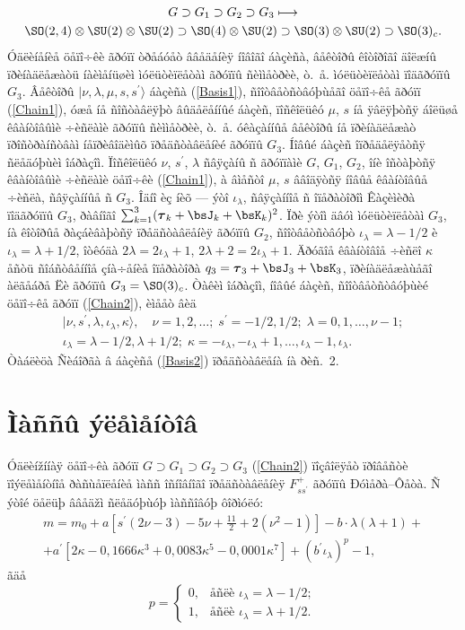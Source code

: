 \begin{multline}
G\supset G_1\supset G_2\supset G_3\longmapsto\\
\SO(2,4)\otimes\SU(2)\otimes\SU(2)\supset\SO(4)\otimes\SU(2)\supset\SO(3)\otimes\SU(2)\supset\SO(3)_c.\label{Chain2}
\end{multline}
Óäëèíåíèå öåïî÷êè ãðóïï òðåáóåò ââåäåíèÿ íîâîãî áàçèñà, âåêòîðû êîòîðîãî äîëæíû ïðèíàäëåæàòü íàèìåíüøèì ìóëüòèïëåòàì ãðóïïû ñèììåòðèè, ò.~å. ìóëüòèïëåòàì ïîäãðóïïû $G_3$. Âåêòîðû $|\nu,\lambda,\mu,s,s^\prime\rangle$ áàçèñà (\ref{Basis1}), ñîîòâåòñòâóþùåãî öåïî÷êå ãðóïï (\ref{Chain1}), óæå íå ñîñòàâëÿþò âûäåëåííûé áàçèñ, ïîñêîëüêó $\mu$, $s$ íå ÿâëÿþòñÿ áîëüøå êâàíòîâûìè ÷èñëàìè ãðóïïû ñèììåòðèè, ò.~å. óêàçàííûå âåêòîðû íå ïðèíàäëåæàò ïðîñòðàíñòâàì íåïðèâîäèìûõ ïðåäñòàâëåíèé ãðóïïû $G_3$. Íîâûé áàçèñ îïðåäåëÿåòñÿ ñëåäóþùèì îáðàçîì. Ïîñêîëüêó $\nu$, $s^\prime$, $\lambda$ ñâÿçàíû ñ ãðóïïàìè $G$, $G_1$, $G_2$, îíè îñòàþòñÿ êâàíòîâûìè ÷èñëàìè öåïî÷êè (\ref{Chain1}), à âìåñòî $\mu$, $s$ ââîäÿòñÿ íîâûå êâàíòîâûå ÷èñëà, ñâÿçàííûå ñ $G_3$. Îäíî èç íèõ --- ýòî $\iota_\lambda$, ñâÿçàííîå ñ îïåðàòîðîì Êàçèìèðà ïîäãðóïïû $G_3$, ðàâíîãî $\sum^3_{k=1}(\boldsymbol{\tau}_k+\bsJ_k+\bsK_k)^2$. Ïðè ýòîì äâóì ìóëüòèïëåòàì $G_3$, íà êîòîðûå ðàçáèâàþòñÿ ïðåäñòàâëåíèÿ ãðóïïû $G_2$, ñîîòâåòñòâóþò $\iota_\lambda=\lambda-1/2$ è $\iota_\lambda=\lambda+1/2$, îòêóäà $2\lambda=2\iota_\lambda+1$, $2\lambda+2=2\iota_\lambda+1$. Äðóãîå êâàíòîâîå ÷èñëî $\kappa$ åñòü ñîáñòâåííîå çíà÷åíèå îïåðàòîðà $q_3=\boldsymbol{\tau}_3+\bsJ_3+\bsK_3$, ïðèíàäëåæàùåãî àëãåáðå Ëè ãðóïïû $G_3=\SO(3)_c$. Òàêèì îáðàçîì, íîâûé áàçèñ, ñîîòâåòñòâóþùèé öåïî÷êå ãðóïï (\ref{Chain2}), èìååò âèä
\begin{multline}
|\nu,s^\prime,\lambda,\iota_\lambda,\kappa\rangle,\quad \nu=1,2,\ldots;\;s^\prime=-1/2,1/2;\;\lambda=0,1,\ldots, \nu-1;\\
\iota_\lambda=\lambda-1/2,\lambda+1/2;\;\kappa=-\iota_\lambda, -\iota_\lambda+1,\ldots,\iota_\lambda-1,\iota_\lambda.\label{Basis2}
\end{multline}
Òàáëèöà Ñèáîðãà â áàçèñå (\ref{Basis2}) ïðåäñòàâëåíà íà ðèñ.\, 2.
\section{Ìàññû ýëåìåíòîâ}
Óäëèížííàÿ öåïî÷êà ãðóïï $G\supset G_1\supset G_2\supset G_3$ (\ref{Chain2}) ïîçâîëÿåò ïðîâåñòè ïîýëåìåíòíîå ðàñùåïëåíèå ìàññ îñíîâíîãî ïðåäñòàâëåíèÿ $F^+_{ss^\prime}$ ãðóïïû Ðóìåðà--Ôåòà. Ñ ýòîé öåëüþ ââåäžì ñëåäóþùóþ ìàññîâóþ ôîðìóëó:
\begin{multline}
m=m_0+a\left[s^\prime(2\nu-3)-5\nu+\frac{11}{2}+2(\nu^2-1)\right]-b\cdot\lambda(\lambda+1)+\\
+a^\prime\left[2\kappa-0{,}1666\kappa^3+0{,}0083\kappa^5-0{,}0001\kappa^7\right]+\left(b^\prime\iota_\lambda\right)^p-1,
\label{Mass2}
\end{multline}
ãäå
\[
p=\left\{\begin{array}{rl}
0, & \mbox{åñëè $\iota_\lambda=\lambda-1/2$};\\
1, & \mbox{åñëè $\iota_\lambda=\lambda+1/2$}.
\end{array}\right.
\]

